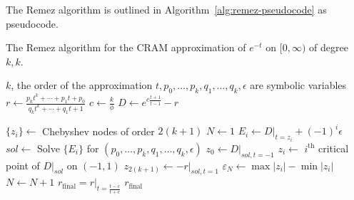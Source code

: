 The Remez algorithm is outlined in Algorithm~\ref{alg:remez-pseudocode} as pseudocode.
\begin{algorithm}
  \caption{The Remez algorithm for the CRAM approximation of $e^{-t}$ on
    $[0, \infty)$ of degree $k,k$.}\label{alg:remez-pseudocode}
  \begin{algorithmic}[1]
    \REQUIRE  $k$, the order of the approximation
    \STATE $t, p_0, \ldots, p_k, q_1, \ldots, q_k, \epsilon$ are symbolic variables
    \STATE $r \leftarrow \frac{p_kt^k + \cdots + p_1t + p_0}{q_kt^k + \cdots +
      q_1t + 1}$
    \STATE $c \leftarrow \frac{k}{\phi}$
    \STATE $D \leftarrow e^{c\frac{t+1}{t-1}} - r$

    \STATE $\{z_i\} \leftarrow$ Chebyshev nodes of order $2(k+1)$
    \STATE $N \leftarrow 1$
    \REPEAT
        \STATE $E_i \leftarrow D|_{t=z_i} + (-1)^i\epsilon$
      \ENDFOR
      \STATE $sol \leftarrow$ Solve $\{E_i\}$ for $(p_0,\ldots,p_k,q_1,\ldots,q_k,\epsilon)$
      \STATE $z_0 \leftarrow D|_{sol,t=-1}$
      \STATE $z_i \leftarrow$ $i^\mathrm{th}$ critical point of $D|_{sol}$ on
      $(-1, 1)$ 
      \STATE $z_{2(k + 1)} \leftarrow -r|_{sol,t=1}$ 
      \STATE $\varepsilon_N \leftarrow \max{|z_i|} - \min{|z_i|}$
      \STATE $N \leftarrow N + 1$
    \STATE $r_\mathrm{final}=r|_{t=\frac{t - c}{t + c}}$ \COMMENT{translate
      $[-1, 1)$ back to $[0, \infty)$ and normalize $q_0=1$}
    \ENSURE $r_\mathrm{final}$
  \end{algorithmic}
\end{algorithm}
